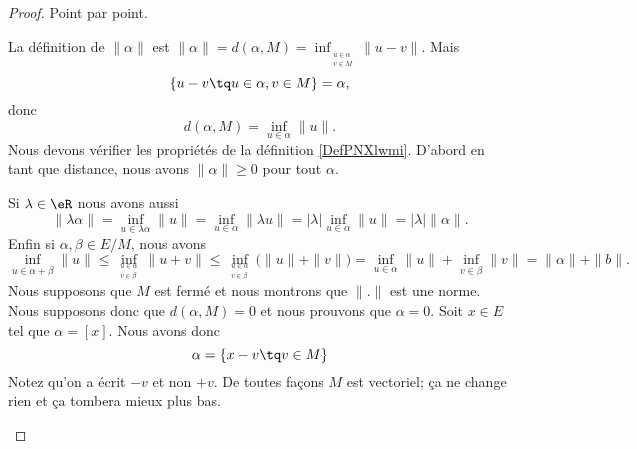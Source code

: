 \begin{proof}
	Point par point.
	\begin{subproof}
		La définition de \( \| \alpha \|\) est \( \| \alpha \|=d(\alpha,M)=\inf_{_{\substack{u\in \alpha\\v\in M}}}\| u-v \|\). Mais
		\begin{equation}
			\{ u-v\tq u\in \alpha,v\in M \}=\alpha,
		\end{equation}
		donc
		\begin{equation}
			d(\alpha,M)=\inf_{u\in \alpha}\| u \|.
		\end{equation}
		Nous devons vérifier les propriétés de la définition \ref{DefPNXlwmi}. D'abord en tant que distance, nous avons \( \| \alpha \|\geq 0\) pour tout \( \alpha\).

		Si \( \lambda\in \eR\) nous avons aussi
		\begin{equation}
			\| \lambda\alpha \|=\inf_{u\in \lambda \alpha}\| u \|=\inf_{u\in \alpha}\| \lambda u \|=| \lambda |\inf_{u\in \alpha}\| u \|=| \lambda |\| \alpha \|.
		\end{equation}
		Enfin si \( \alpha,\beta\in E/M\), nous avons
		\begin{equation}
			\inf_{u\in \alpha+\beta}\| u \|\leq \inf_{_{\substack{u\in \alpha\\v\in \beta}}}\| u+v \|\leq \inf_{_{\substack{u\in \alpha\\v\in \beta}}}\big( \| u \|+\| v \| \big)=\inf_{u\in \alpha}\| u \|+\inf_{v\in \beta}\| v \|=\| \alpha \|+\| b \|.
		\end{equation}
		Nous supposons que \( M\) est fermé et nous montrons que \( \| . \|\) est une norme. Nous supposons donc que \( d(\alpha,M)=0\) et nous prouvons que \( \alpha=0\). Soit \( x\in E\) tel que \( \alpha=[x]\). Nous avons donc
		\begin{equation}
			\alpha=\{ x-v\tq v\in M \}
		\end{equation}
		Notez qu'on a écrit \( -v\) et non \( +v\). De toutes façons \( M\) est vectoriel; ça ne change rien et ça tombera mieux plus bas.


\end{subproof}
\end{proof}
